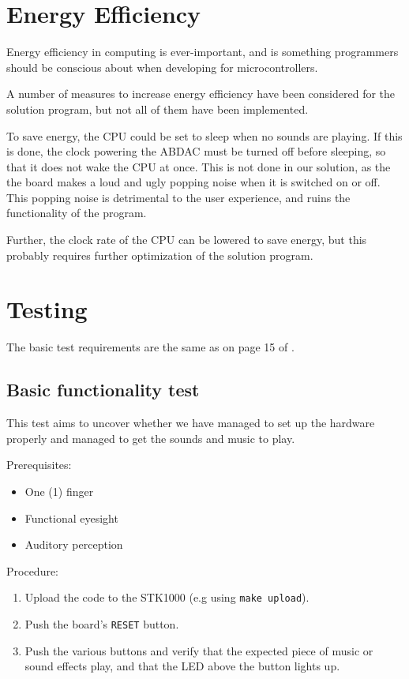 \section{Energy Efficiency}

Energy efficiency in computing is ever-important, and is something programmers should be conscious about when developing for microcontrollers.

A number of measures to increase energy efficiency have been considered for the solution program, but not all of them have been implemented.

To save energy, the CPU could be set to sleep when no sounds are playing.
If this is done, the clock powering the ABDAC must be turned off before sleeping, so that it does not wake the CPU at once.
This is not done in our solution, as the the board makes a loud and ugly popping noise when it is switched on or off.
This popping noise is detrimental to the user experience, and ruins the functionality of the program.

Further, the clock rate of the CPU can be lowered to save energy, but this probably requires further optimization of the solution program.

\section{Testing}

The basic test requirements are the same as on page 15 of \cite{tdt4258-1}.

\subsection{Basic functionality test}

This test aims to uncover whether we have managed to set up the hardware properly and managed to get the sounds and music to play.

Prerequisites:
\begin{itemize}
    \item{One (1) finger}
    \item{Functional eyesight}
    \item{Auditory perception}
\end{itemize}

Procedure:
\begin{enumerate}
    \item{Upload the code to the STK1000 (e.g using \texttt{make upload}).}
    \item{Push the board's \texttt{RESET} button.}
    \item{Push the various buttons and verify that the expected piece of music or sound effects play, and that the LED above the button lights up.}
\end{enumerate}


